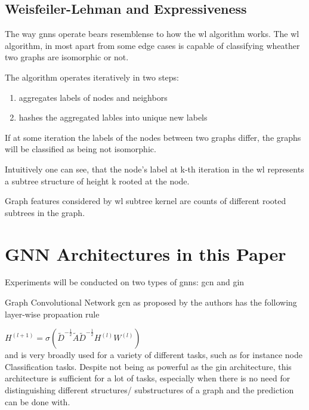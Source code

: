 \subsection{Weisfeiler-Lehman and Expressiveness}
\label{sec:related:wl}

The way \acp{gnn} operate bears resemblense to how the \ac{wl} algorithm works.
The \ac{wl} algorithm, in most apart from some edge cases is capable of classifying wheather
two graphs are isomorphic or not.

The algorithm operates iteratively in two steps:

\begin{enumerate}[label = {(\arabic*)}]
    \item aggregates labels of nodes and neighbors
    \item hashes the aggregated lables into unique new labels
\end{enumerate}

If at some iteration the labels of the nodes between two graphs differ, the
graphs will be classified as being not isomorphic.

Intuitively one can see, that the node's label at k-th iteration in the \ac{wl}
represents a subtree structure of height k rooted at the node.

Graph features considered by \ac{wl} subtree kernel are counts of different rooted subtrees
in the graph.



\section{GNN Architectures in this Paper}
\label{sec:related:sec4}

Experiments will be conducted on two types of \acp{gnn}: \ac{gcn} and \ac{gin}


Graph Convolutional Network \ac{gcn} as proposed by the authors \cite{Kipf2017} has the
following layer-wise propaation rule

$H^{(l+1)} = \sigma (\tilde{D}^{-\frac{1}{2}}\tilde{A}\tilde{D}^{-\frac{1}{2}} H^{(l)}W^{(l)})$\\
and is very broadly used for a variety of different tasks, such as for instance node Classification tasks.
Despite not being as powerful as the \ac{gin} architecture, this architecture is sufficient for a lot
of tasks, especially when there is no need for distinguishing different structures/ substructures
of a graph and the prediction can be done with.

